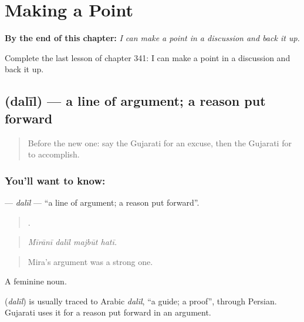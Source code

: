 
\chapter{Making a Point}
\label{ch:gu-making-a-point}

\begin{chapteropening}
\textbf{By the end of this chapter:} \emph{I can make a point in a discussion and back it up.}

Complete the last lesson of chapter 341: I can make a point in a discussion and back it up.
\end{chapteropening}

\section[\texorpdfstring{\gu{દલીલ} (dalīl)}{દલીલ (dalīl)}]{ (dalīl) — a line of argument; a reason put forward}

\label{lesson:GU-C341-dalil}



\begin{quote}
Before the new one: say the Gujarati for an excuse, then the Gujarati for to accomplish.
\end{quote}

\subsection*{You'll want to know: }
\textbf{} — \emph{dalīl} — \textquotedblleft{}a line of argument; a reason put forward\textquotedblright{}.

\begin{quote}
   .
\end{quote}

\begin{quote}
\emph{Mīrānī dalīl majbūt hatī.}
\end{quote}

\begin{quote}
Mira's argument was a strong one.
\end{quote}

A feminine noun.

\begin{cousinweb}
\textbf{} (\emph{dalīl}) is usually traced to Arabic \emph{dalīl}, \textquotedblleft{}a guide; a proof\textquotedblright{}, through Persian. Gujarati uses it for a reason put forward in an argument.
\end{cousinweb}

